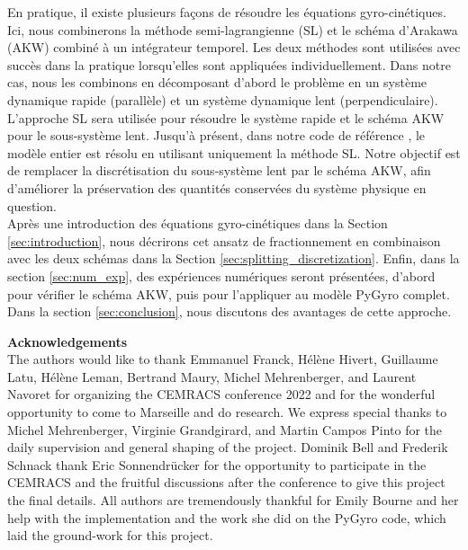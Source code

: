 \documentclass[proc]{edpsmath}
\begin{document}
\begin{resume}%
	En pratique, il existe plusieurs façons de résoudre les équations gyro-cinétiques. Ici, nous combinerons la méthode semi-lagrangienne (SL) et le schéma d'Arakawa (AKW) combiné à un intégrateur temporel. Les deux méthodes sont utilisées avec succès dans la pratique lorsqu'elles sont appliquées individuellement. Dans notre cas, nous les combinons en décomposant d'abord le problème en un système dynamique rapide (parallèle) et un système dynamique lent (perpendiculaire). L'approche SL sera utilisée pour résoudre le système rapide et le schéma AKW pour le sous-système lent. Jusqu'à présent, dans notre code de référence \cite{pygyro_code}, le modèle entier est résolu en utilisant uniquement la méthode SL. Notre objectif est de remplacer la discrétisation du sous-système lent par le schéma AKW, afin d'améliorer la préservation des quantités conservées du système physique en question. \\
	Après une introduction des équations gyro-cinétiques dans la Section \ref{sec:introduction}, nous décrirons cet ansatz de fractionnement en combinaison avec les deux schémas dans la Section \ref{sec:splitting_discretization}. Enfin, dans la section \ref{sec:num_exp}, des expériences numériques seront présentées, d'abord pour vérifier le schéma AKW, puis pour l'appliquer au modèle PyGyro complet. Dans la section \ref{sec:conclusion}, nous discutons des avantages de cette approche. 
\end{resume}

\maketitle
\newpage
\tableofcontents %










\begin{acknowledgement}
	\textbf{Acknowledgements}\\
	The authors would like to thank Emmanuel Franck, Hélène Hivert, Guillaume Latu, Hélène Leman, Bertrand Maury, Michel Mehrenberger, and Laurent Navoret for organizing the CEMRACS conference 2022 and for the wonderful opportunity to come to Marseille and do research. We express special thanks to Michel Mehrenberger, Virginie Grandgirard, and Martin Campos Pinto for the daily supervision and general shaping of the project. Dominik Bell and Frederik Schnack thank Eric Sonnendrücker for the opportunity to participate in the CEMRACS and the fruitful discussions after the conference to give this project the final details. All authors are tremendously thankful for Emily Bourne and her help with the implementation and the work she did on the PyGyro code, which laid the ground-work for this project.
\end{acknowledgement}



\end{document}
